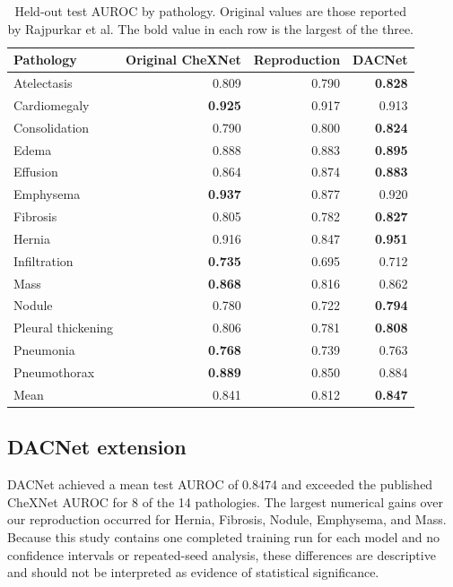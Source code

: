 \begin{table}[ht]
\centering
\small
\begin{tabular}{lrrr}
\hline
\textbf{Pathology} & \textbf{Original CheXNet} & \textbf{Reproduction} & \textbf{DACNet} \\
\hline
Atelectasis        & 0.809 & 0.790 & \textbf{0.828} \\
Cardiomegaly       & \textbf{0.925} & 0.917 & 0.913 \\
Consolidation      & 0.790 & 0.800 & \textbf{0.824} \\
Edema              & 0.888 & 0.883 & \textbf{0.895} \\
Effusion           & 0.864 & 0.874 & \textbf{0.883} \\
Emphysema          & \textbf{0.937} & 0.877 & 0.920 \\
Fibrosis           & 0.805 & 0.782 & \textbf{0.827} \\
Hernia             & 0.916 & 0.847 & \textbf{0.951} \\
Infiltration       & \textbf{0.735} & 0.695 & 0.712 \\
Mass               & \textbf{0.868} & 0.816 & 0.862 \\
Nodule             & 0.780 & 0.722 & \textbf{0.794} \\
Pleural thickening & 0.806 & 0.781 & \textbf{0.808} \\
Pneumonia          & \textbf{0.768} & 0.739 & 0.763 \\
Pneumothorax       & \textbf{0.889} & 0.850 & 0.884 \\
\hline
Mean               & 0.841 & 0.812 & \textbf{0.847} \\
\hline
\end{tabular}
\caption{Held-out test AUROC by pathology. Original values are those reported
by Rajpurkar et al. The bold value in each row is the largest of the three.}
\label{tab:test_auc_scores}
\end{table}

\subsection{DACNet extension}

DACNet achieved a mean test AUROC of 0.8474 and exceeded the published CheXNet
AUROC for 8 of the 14 pathologies. The largest numerical gains over our
reproduction occurred for Hernia, Fibrosis, Nodule, Emphysema, and Mass.
Because this study contains one completed training run for each model and no
confidence intervals or repeated-seed analysis, these differences are
descriptive and should not be interpreted as evidence of statistical
significance.

